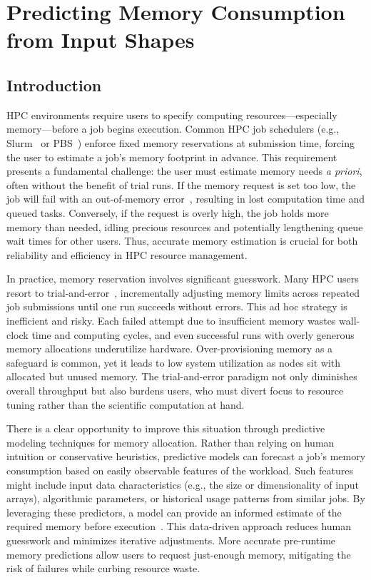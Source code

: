 \chapter{Predicting Memory Consumption from Input Shapes}
\label{ch:predicting-memory-consumption-from-input-shapes}


\section{Introduction}
\label{sec:pmc-introduction}

\ac{HPC} environments require users to specify computing resources—especially memory—before a job begins execution.
Common \ac{HPC} job schedulers (e.g., Slurm~\cite{yoo2003slurm} or PBS~\cite{henderson1995pbs}) enforce fixed memory reservations at submission time, forcing the user to estimate a job’s memory footprint in advance.
This requirement presents a fundamental challenge: the user must estimate memory needs \emph{a priori}, often without the benefit of trial runs.
If the memory request is set too low, the job will fail with an out-of-memory error~\cite{bailey2005,hovestadt2003}, resulting in lost computation time and queued tasks.
Conversely, if the request is overly high, the job holds more memory than needed, idling precious resources and potentially lengthening queue wait times for other users.
Thus, accurate memory estimation is crucial for both reliability and efficiency in \ac{HPC} resource management.

In practice, memory reservation involves significant guesswork.
Many \ac{HPC} users resort to trial-and-error~\cite{ncsu_memory_usage}, incrementally adjusting memory limits across repeated job submissions until one run succeeds without errors.
This ad hoc strategy is inefficient and risky.
Each failed attempt due to insufficient memory wastes wall-clock time and computing cycles, and even successful runs with overly generous memory allocations underutilize hardware.
Over-provisioning memory as a safeguard is common, yet it leads to low system utilization as nodes sit with allocated but unused memory.
The trial-and-error paradigm not only diminishes overall throughput but also burdens users, who must divert focus to resource tuning rather than the scientific computation at hand.

There is a clear opportunity to improve this situation through predictive modeling techniques for memory allocation.
Rather than relying on human intuition or conservative heuristics, predictive models can forecast a job’s memory consumption based on easily observable features of the workload.
Such features might include input data characteristics (e.g., the size or dimensionality of input arrays), algorithmic parameters, or historical usage patterns from similar jobs.
By leveraging these predictors, a model can provide an informed estimate of the required memory before execution~\cite{tanash2021ampro}.
This data-driven approach reduces human guesswork and minimizes iterative adjustments.
More accurate pre-runtime memory predictions allow users to request just-enough memory, mitigating the risk of failures while curbing resource waste.

